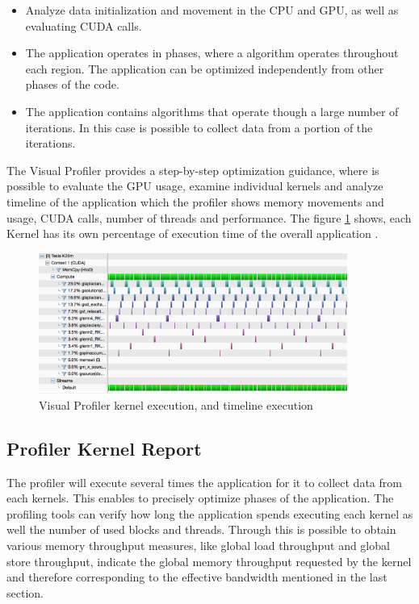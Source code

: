 \begin{itemize}
  \item Analyze data initialization and movement in the CPU and GPU, as well as evaluating CUDA calls.
  \item The application operates in phases, where a algorithm operates throughout each region. The application can be optimized independently from other phases of the code.
  \item The application contains algorithms that operate though a large number of iterations. In this case is possible to collect data from a portion of the iterations.
\end{itemize}

The Visual Profiler provides a step-by-step optimization guidance, where is possible to evaluate the GPU usage, examine individual kernels and analyze timeline of the application which the profiler shows memory movements and usage, CUDA calls, number of threads and performance. The figure \ref{fig:visual01} shows, each Kernel has its own percentage of execution time of the overall application \cite{practices}.

\begin{figure}[htbp]
	\centering
		\includegraphics[width=0.9\textwidth]{Figures/pofiler.png}
		\smallskip
	\caption[Visual Profiler timeline and stream process]{Visual Profiler kernel execution, and timeline execution}
	\label{fig:visual01}
\end{figure}

\subsection{Profiler Kernel Report}

The profiler will execute several times the application for it to collect data from each kernels. This enables to precisely optimize phases of the application\cite{example}. The profiling tools can verify how long the application spends executing each kernel as well the number of used blocks and threads. Through this is possible to obtain various memory throughput measures, like global load throughput and global store throughput, indicate the global memory throughput requested by the kernel and therefore corresponding to the effective bandwidth mentioned in the last section.

